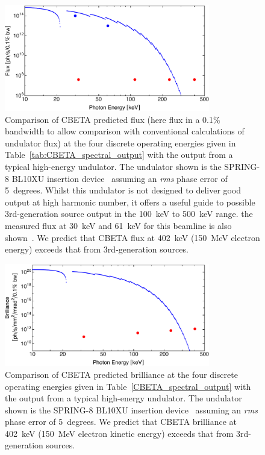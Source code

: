 \documentclass[../main.tex]{subfiles}
\begin{document}
\begin{figure}[!h]
\centering
\includegraphics[width=0.8\textwidth]{Figures/CBETA_Inverse_Compton_Source_Design/spring8bl10fluxplot.pdf}
\caption{Comparison of CBETA predicted flux (here flux in a 0.1\% bandwidth to allow comparison with conventional calculations of undulator flux) at the four discrete operating energies given in Table~\ref{tab:CBETA_spectral_output} with the output from a typical high-energy undulator. The undulator shown is the SPRING-8 BL10XU insertion device~\cite{spring8beamlines} assuming an \textit{rms} phase error of 5~degrees. Whilst this undulator is not designed to deliver good output at high harmonic number, it offers a useful guide to possible 3rd-generation source output in the 100~keV to 500~keV range. the measured flux at 30~keV and 61~keV for this beamline is also shown~\cite{spring8beamlines}. We predict that CBETA flux at 402~keV (150~MeV electron energy) exceeds that from 3rd-generation sources.}
\label{fig:ICS_vs_SPRING8_Undulator_Flux}
\end{figure}

\begin{figure}[!h]
\centering
\includegraphics[width=0.8\textwidth]{Figures/CBETA_Inverse_Compton_Source_Design/spring8bl10brillianceplot.pdf}
\caption{Comparison of CBETA predicted brilliance at the four discrete operating energies given in Table~\ref{CBETA_spectral_output} with the output from a typical high-energy undulator. The undulator shown is the SPRING-8 BL10XU insertion device~\cite{spring8beamlines} assuming an \textit{rms} phase error of 5~degrees. We predict that CBETA brilliance at 402~keV (150~MeV electron kinetic energy) exceeds that from 3rd-generation sources.}
\label{fig:ICS_vs_SPRING8_Undulator_Brilliance}
\end{figure}
\end{document}
